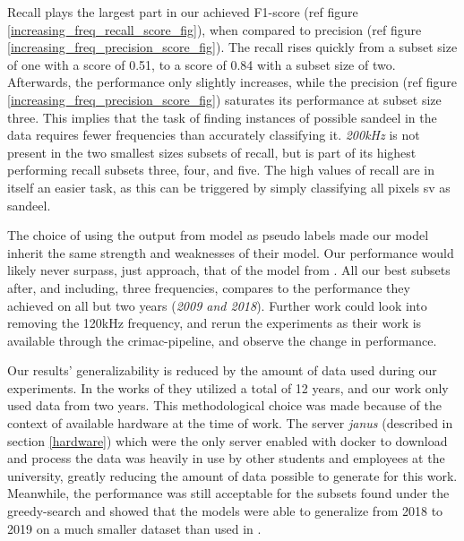     Recall plays the largest part in our achieved F1-score (ref figure \ref{increasing_freq_recall_score_fig}), when compared to precision (ref figure \ref{increasing_freq_precision_score_fig}). The recall rises quickly from a subset size of one with a score of 0.51, to a score of 0.84 with a subset size of two. Afterwards, the performance  only slightly increases, while the precision (ref figure \ref{increasing_freq_precision_score_fig}) saturates its performance at subset size three. This implies that the task of finding instances of possible sandeel in the data requires fewer frequencies than accurately classifying it. \textit{200kHz} is not present in the two smallest sizes subsets of recall, but is part of its highest performing recall subsets three, four, and five. The high values of recall are in itself an easier task, as this can be triggered by simply classifying all pixels \gls{sv} as sandeel. 
    
    The choice of using the output from \citeauthor{brautaset2020acoustic} model as pseudo labels made our model inherit the same strength and weaknesses of their model. Our performance would likely never surpass, just approach, that of the model from \citeauthor{brautaset2020acoustic}. All our best subsets after, and including, three frequencies, compares to the performance they achieved on all but two years (\textit{2009 and 2018}). Further work could look into removing the 120kHz frequency, and rerun the experiments as their work is available through the \gls{crimac}-pipeline, and observe the change in performance. 
    
    Our results' generalizability is reduced by the amount of data used during our experiments. In the works of \citeauthor{brautaset2020acoustic} they utilized a total of 12 years, and our work only used data from two years. This methodological choice was made because of the context of available hardware at the time of work. The server \textit{janus} (described in section \ref{hardware}) which were the only server enabled with docker to download and process the data was heavily in use by other students and employees at the university, greatly reducing the amount of data possible to generate for this work. Meanwhile, the performance was still acceptable for the subsets found under the greedy-search and showed that the models were able to generalize from 2018 to 2019 on a much smaller dataset than used in \citeauthor{brautaset2020acoustic}. 
    

